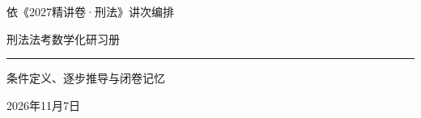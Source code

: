 \documentclass{ctexbook}
\begin{document}
\begin{titlepage}
 \thispagestyle{empty}
 \centering
 \vspace*{4\baselineskip}
 {\large 依《2027精讲卷·刑法》讲次编排\par}
 \vfill
 {\fontsize{32}{44}\selectfont\heiti 刑法法考数学化研习册\par}
 \vspace{\baselineskip}
 {\color{GuideGreen}\rule{.6\linewidth}{1pt}\par}
 \vspace{1.5\baselineskip}
 {\Large 条件定义、逐步推导与闭卷记忆\par}
 \vfill
 {\large 2026年11月7日\par}
 \vspace{3\baselineskip}
\end{titlepage}
\begingroup
\let\cleardoublepage\clearpage
\frontmatter
\setcounter{page}{2}
\pagestyle{plain}
\tableofcontents
\clearpage
\endgroup
\mainmatter


\appendix




\end{document}
